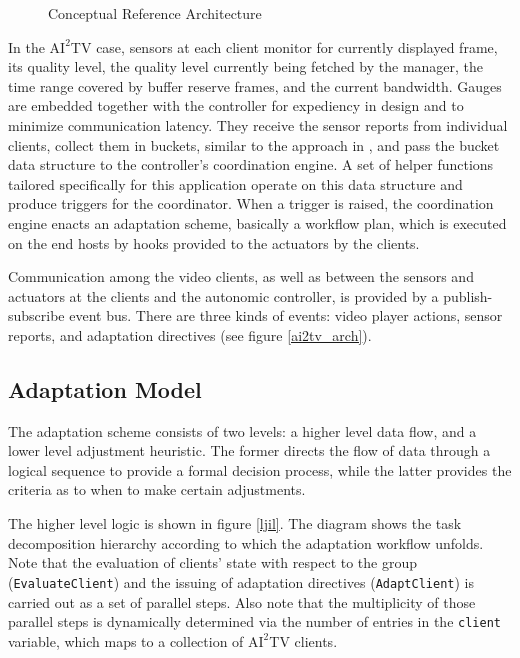 \documentclass{sig-alternate}
\begin{document}
%
%

\begin{figure}
 \centering
  \label{refarch}
 \caption{Conceptual Reference Architecture}
\end{figure}

In the $\mathrm{AI}^2$TV case, sensors at each client monitor for
currently displayed frame, its quality level, the quality level
currently being fetched by the manager, the time range covered by
buffer reserve frames, and the current bandwidth.  Gauges are embedded
together with the controller for expediency in design and to minimize
communication latency.  They receive the sensor reports from
individual clients, collect them in buckets, similar to the approach
in \cite{MIMAZE}, and pass the bucket data structure to the
controller's coordination engine.  A set of helper functions tailored
specifically for this application operate on this data structure and
produce triggers for the coordinator.  When a trigger is raised, the
coordination engine enacts an adaptation scheme, basically a workflow
plan, which is executed on the end hosts by hooks provided to the
actuators by the clients.


Communication among the video clients, as well as between the sensors
and actuators at the clients and the autonomic controller, is provided
by a publish-subscribe event bus.  There are three kinds of events:
video player actions, sensor reports, and adaptation directives (see
figure \ref{ai2tv_arch}).

\subsection{Adaptation Model}

The adaptation scheme consists of two levels: a higher level data
flow, and a lower level adjustment heuristic.  The former directs the
flow of data through a logical sequence to provide a formal decision
process, while the latter provides the criteria as to when to make
certain adjustments.

The higher level logic is shown in figure \ref{ljil}.  The diagram
shows the task decomposition hierarchy according to which the
adaptation workflow unfolds.  Note that the evaluation of clients'
state with respect to the group (\texttt{EvaluateClient}) and the
issuing of adaptation directives (\texttt{AdaptClient}) is carried out
as a set of parallel steps.  Also note that the multiplicity of those
parallel steps is dynamically determined via the number of entries in
the \texttt{client} variable, which maps to a collection of
$\mathrm{AI}^2$TV clients.
\end{document}
